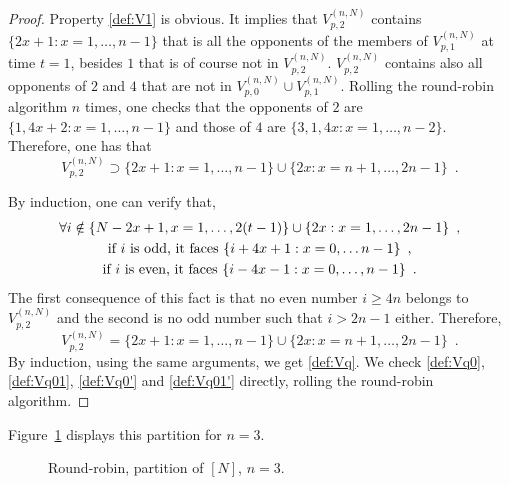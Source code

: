 \begin{proof}
Property \eqref{def:V1} is obvious. It implies that $V_{p,2}^{(n,N)}$ contains $\{2x+1 : x=1,\ldots,n-1\}$ that is all the opponents of the members of $V_{p,1}^{(n,N)}$ at time $t=1$, besides $1$ that is of course not in $V_{p,2}^{(n,N)}$. $V_{p,2}^{(n,N)}$ contains also all opponents of $2$ and $4$ that are not in $V_{p,0}^{(n,N)}\cup V_{p,1}^{(n,N)}$. Rolling the round-robin algorithm $n$ times, one checks that the opponents of $2$ are $\{1,4x+2 : x=1,\ldots,n-1\}$ and those of $4$ are $\{3,1,4x : x=1,\ldots,n-2\}$. Therefore, one has that 
\[
V_{p,2}^{(n,N)}\supset \{2x+1 : x=1,\ldots,n-1\}\cup\{2x : x=n+1,\ldots,2n-1\}\enspace.
\]

By induction, one can verify that, 
\begin{gather}
\notag\forall i\notin \{N-2x+1, x=1,\ldots,2(t-1)\}\cup \{2x : x=1,\ldots, 2n-1\}\enspace,\\
\notag\text{if }i \text{ is odd, it faces }\{i+4x+1 : x=0,\ldots n-1\}\enspace,\\
\label{eq:Opponents}\text{if }i \text{ is even, it faces }\{i-4x-1 : x=0,\ldots,n-1\}\enspace.
\end{gather}
The first consequence of this fact is that no even number $i\ge 4n$ belongs to $V_{p,2}^{(n,N)}$ and the second is no odd number such that $i>2n-1$ either. Therefore,
\begin{equation*}
 V_{p,2}^{(n,N)}= \{2x+1 : x=1,\ldots,n-1\}\cup\{2x : x=n+1,\ldots,2n-1\}\enspace.
\end{equation*}
By induction, using the same arguments, we get \eqref{def:Vq}.
We check \eqref{def:Vq0}, \eqref{def:Vq01}, \eqref{def:Vq0'} and \eqref{def:Vq01'} directly, rolling the round-robin algorithm. 
\end{proof}
Figure~\ref{fig:robin:partitionP} displays this partition for $n = 3$.

\begin{figure}
\centering
{}
\caption{Round-robin, partition of $[N]$, $n=3$.}
\label{fig:robin:partitionP}
\end{figure}

